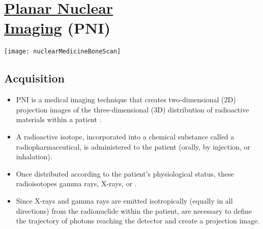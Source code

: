 \chapter[\glsentrylong{PNI}]{\href{https://www.radiologycafe.com/frcr-physics-notes/molecular-imaging/planar-imaging/}{Planar Nuclear\\Imaging} (\gls{PNI})}
\vspace{-51ex}
\begin{flushright}
\texttt{[image: nuclearMedicineBoneScan]} %
\end{flushright}


\section{Acquisition}
\begin{itemize}
\item \gls{PNI} is a medical imaging technique that
  creates two-dimensional (2D) projection images of the
  three-dimensional (3D) distribution of radioactive materials within
  a patient \cite{bushberg2011essential}.
\item A radioactive isotope, incorporated into a chemical substance
  called a radiopharmaceutical, is administered to the patient
  (orally, by injection, or inhalation).
\item Once distributed according to the patient's physiological
  status, these radioisotopes 
  gamma rays, X-rays, or .
\item Since X-rays and gamma rays are emitted isotropically (equally
  in all directions) from the radionuclide within the patient,
   are necessary to define the trajectory of photons
  reaching the detector and create a projection image.
\end{itemize}

